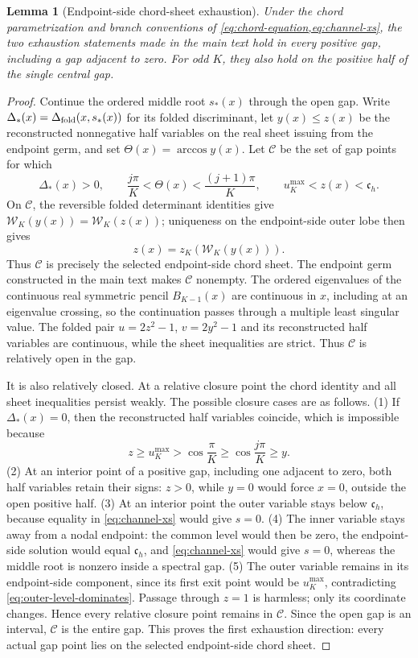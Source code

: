 \documentclass[12pt,anonymous]{iopjournal}
\numberwithin{equation}{section}
\newtheorem{lemma}[lemma]{Lemma}
\theoremstyle{remark}
\begin{document}
\begin{lemma}[Endpoint-side chord-sheet exhaustion]
\label{lem:chord-sheet-exhaustion}
Under the chord parametrization and branch conventions of
\cref{eq:chord-equation,eq:channel-xs}, the two exhaustion statements made in
the main text hold in every positive gap, including a gap adjacent to zero.
For odd \(K\), they also hold on the positive half of the single central gap.
\end{lemma}

\begin{proof}
Continue the ordered middle root \(s_*(x)\) through the open gap.  Write
\(\Delta_*(x)=\Delta_{\rm fold}(x,s_*(x))\) for its folded discriminant,
let \(y(x)\leq z(x)\) be the reconstructed nonnegative half variables on
the real sheet issuing from the endpoint germ, and set
\(\Theta(x)=\arccos y(x)\).  Let \(\mathcal C\) be the set of gap points for
which
\[
 \Delta_*(x)>0,\qquad
 \frac{j\pi}{K}<\Theta(x)<\frac{(j+1)\pi}{K},\qquad
 u_K^{\max}<z(x)<\mathfrak c_h.
\]
On \(\mathcal C\), the reversible folded determinant identities give
\(\mathcal W_K(y(x))=\mathcal W_K(z(x))\); uniqueness on the endpoint-side
outer lobe then gives
\[
 z(x)=z_K(\mathcal W_K(y(x))).
\]
Thus \(\mathcal C\) is precisely the selected endpoint-side chord sheet.
The endpoint germ constructed in the main text makes \(\mathcal C\)
nonempty.  The ordered eigenvalues of the continuous real symmetric pencil
\(B_{K-1}(x)\) are continuous in \(x\), including at an eigenvalue crossing,
so the continuation passes through a multiple least singular value.  The
folded pair \(u=2z^2-1\), \(v=2y^2-1\) and its reconstructed half variables
are continuous, while the sheet inequalities are strict.  Thus
\(\mathcal C\) is relatively open in the gap.

It is also relatively closed.  At a relative closure point the chord
identity and all sheet inequalities persist weakly.  The possible closure
cases are as follows.  (1) If \(\Delta_*(x)=0\), then the reconstructed half
variables coincide, which is impossible because
\[
 z\geq u_K^{\max}>\cos\frac{\pi}{K}
 \geq\cos\frac{j\pi}{K}\geq y.
\]
(2) At an interior point of a positive gap, including one adjacent to zero,
both half variables retain their signs: \(z>0\), while \(y=0\) would force
\(x=0\), outside the open positive half.  (3) At an interior point the outer
variable stays below \(\mathfrak c_h\), because equality in
\eqref{eq:channel-xs} would give \(s=0\).  (4) The inner variable stays away
from a nodal endpoint: the common level would then be zero, the endpoint-side
solution would equal \(\mathfrak c_h\), and \eqref{eq:channel-xs} would give
\(s=0\), whereas the middle root is nonzero inside a spectral gap.  (5) The
outer variable remains in its endpoint-side component, since its first exit
point would be \(u_K^{\max}\), contradicting
\eqref{eq:outer-level-dominates}.  Passage through \(z=1\) is harmless; only
its coordinate changes.  Hence every relative closure point remains in
\(\mathcal C\).  Since the open gap is an interval, \(\mathcal C\) is the
entire gap.  This proves the first exhaustion direction: every actual gap
point lies on the selected endpoint-side chord sheet.


\end{proof}
\end{document}
